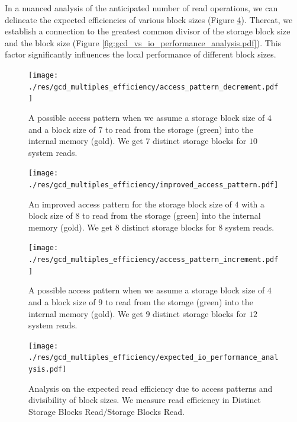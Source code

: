 \documentclass[twocolumn]{article}
\begin{document}
In a nuanced analysis of the anticipated number of read operations, we can delineate the expected efficiencies of various block sizes (Figure \ref{fig:expected_io_performance_analysis.pdf}). 
Thereat, we establish a connection to the greatest common divisor of the storage block size and the block size (Figure \ref{fig:gcd_vs_io_performance_analysis.pdf}).
This factor significantly influences the local performance of different block sizes.

\begin{figure}[htb]
	\begin{minipage}{0.475 \textwidth}
	\centering
	\texttt{[image: ./res/gcd\_multiples\_efficiency/access\_pattern\_decrement.pdf]}
	\caption{A possible access pattern when we assume a storage block size of \( 4 \) and a block size of \( 7 \) to read from the storage (green) into the internal memory (gold). 
	We get \( 7 \) distinct storage blocks for \( 10 \) system reads. }
	\label{fig:access_pattern_decrement.pdf}
	\end{minipage}
\end{figure}

\begin{figure}[htb]
	\begin{minipage}{0.475 \textwidth}
	\centering
	\texttt{[image: ./res/gcd\_multiples\_efficiency/improved\_access\_pattern.pdf]}
	\caption{An improved access pattern for the storage block size of \( 4 \) with a block size of \( 8 \) to read from the storage (green) into the internal memory (gold). 
	We get \( 8 \) distinct storage blocks for \( 8 \) system reads. }
	\label{fig:improved_access_pattern.pdf}
	\end{minipage}
\end{figure}

\begin{figure}[htb]
	\begin{minipage}{0.475 \textwidth}
	\centering
	\texttt{[image: ./res/gcd\_multiples\_efficiency/access\_pattern\_increment.pdf]}
	\caption{A possible access pattern when we assume a storage block size of \( 4 \) and a block size of \( 9 \) to read from the storage (green) into the internal memory (gold). 
	We get \( 9 \) distinct storage blocks for \( 12 \) system reads. }
	\label{fig:access_pattern_increment.pdf}
	\end{minipage}
\end{figure}

\begin{figure}[htb]
	\begin{minipage}{0.475 \textwidth}
	\centering
	\texttt{[image: ./res/gcd\_multiples\_efficiency/expected\_io\_performance\_analysis.pdf]}
	\caption{Analysis on the expected read efficiency due to access patterns and divisibility of block sizes. We measure read efficiency in Distinct Storage Blocks Read\( / \)Storage Blocks Read. }
	\label{fig:expected_io_performance_analysis.pdf}
	\end{minipage}
\end{figure}
\end{document}
